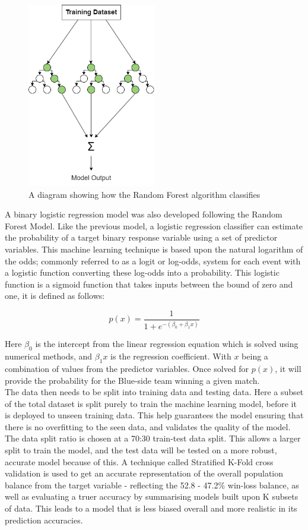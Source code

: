 \begin{figure}[h!]
    \centering
    \includegraphics[width=0.5\textwidth]{figures/RandomForest}
    \caption{A diagram showing how the Random Forest algorithm classifies}
    \label{fig:RandomForest}
\end{figure}

A binary logistic regression model was also developed following the Random Forest Model.
Like the previous model, a logistic regression classifier can estimate the probability of a target binary response variable using a set of predictor variables.
This machine learning technique is based upon the natural logarithm of the odds;
commonly referred to as a logit or log-odds, system for each event with a logistic function converting these log-odds into a probability.
This logistic function is a sigmoid function that takes inputs between the bound of zero and one, it is defined as follows:

\[ p(x) = \frac{1}{1 + e^{-(\beta_0 + \beta_1 x)}} \]

Here \(\beta_{0}\) is the intercept from the linear regression equation which is solved using numerical methods, and \(\beta_{1}x\) is the regression coefficient.
With \(x\) being a combination of values from the predictor variables.
Once solved for \(p(x)\), it will provide the probability for the Blue-side team winning a given match. \\

The data then needs to be split into training data and testing data.
Here a subset of the total dataset is split purely to train the machine learning model, before it is deployed to unseen training data.
This help guarantees the model ensuring that there is no overfitting to the seen data, and validates the quality of the model.
The data split ratio is chosen at a 70:30 train-test data split.
This allows a larger split to train the model, and the test data will be tested on a more robust, accurate model because of this.
A technique called Stratified K-Fold cross validation is used to get an accurate representation of the overall population balance from the target variable - reflecting the 52.8 - 47.2\% win-loss balance, as well as evaluating a truer accuracy by summarising models built upon K subsets of data.
This leads to a model that is less biased overall and more realistic in its prediction accuracies. \\

